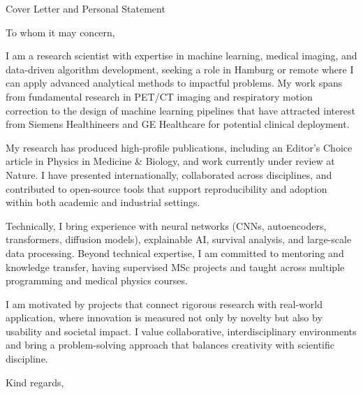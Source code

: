 \documentclass{cv}
\begin{document}
    \begin{spacing}{1.8}
        \begin{rSection}{Cover Letter and Personal Statement}
            \item To whom it may concern,
            
            \item I am a research scientist with expertise in machine learning, medical imaging, and data-driven algorithm development, seeking a role in Hamburg or remote where I can apply advanced analytical methods to impactful problems. My work spans from fundamental research in PET/CT imaging and respiratory motion correction to the design of machine learning pipelines that have attracted interest from Siemens Healthineers and GE Healthcare for potential clinical deployment.

            \item My research has produced high-profile publications, including an Editor’s Choice article in Physics in Medicine \& Biology, and work currently under review at Nature. I have presented internationally, collaborated across disciplines, and contributed to open-source tools that support reproducibility and adoption within both academic and industrial settings.

            \item Technically, I bring experience with neural networks (CNNs, autoencoders, transformers, diffusion models), explainable AI, survival analysis, and large-scale data processing. Beyond technical expertise, I am committed to mentoring and knowledge transfer, having supervised MSc projects and taught across multiple programming and medical physics courses.

            \item I am motivated by projects that connect rigorous research with real-world application, where innovation is measured not only by novelty but also by usability and societal impact. I value collaborative, interdisciplinary environments and bring a problem-solving approach that balances creativity with scientific discipline.
            
            \begin{spacing}{1.0}
                \begin{rSubsection}{}{}{}{}
                    \item Kind regards,
            

\end{rSubsection}
\end{spacing}
\end{rSection}
\end{spacing}
\end{document}
